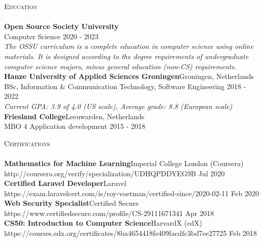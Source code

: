 \documentclass[a4paper]{article}
\newcommand{\lineunder} {
    \vspace*{-8pt} \\
    \hspace*{-18pt} \hrulefill \\
}
\newcommand{\header} [1] {
    {\hspace*{-18pt}\vspace*{6pt} \textsc{#1}}
    \vspace*{-6pt} \lineunder
}
\begin{document}
\header{Education}
\textbf{Open Source Society University}\\
Computer Science \hfill 2020 - 2023\\
\vspace{1mm}
\emph{The OSSU curriculum is a complete education in computer science using online materials. It is designed according to the degree requirements of undergraduate computer science majors, minus general education (non-CS) requirements.}\\
\vspace{2mm}
\textbf{Hanze University of Applied Sciences Groningen}\hfill Groningen, Netherlands\\
BSc, Information \& Communication Technology, Software Engineering \hfill 2018 - 2022\\
\vspace{1mm}
\emph{Current GPA: 3.9 of 4.0 (US scale), Average grade: 8.8 (European scale)}\\
\vspace{2mm}
\textbf{Friesland College}\hfill Leeuwarden, Netherlands\\
MBO 4 Application development \hfill 2015 - 2018\\
\vspace{2mm}

\newpage

\header{Certifications}
\textbf{Mathematics for Machine Learning}\hfill Imperial College London (Coursera)\\
http://coursera.org/verify/specialization/UDHQPDDYEG9B \hfill Jul 2020\\
\vspace{2mm}
\textbf{Certified Laravel Developer}\hfill Laravel\\
https://exam.laravelcert.com/is/roy-voetman/certified-since/2020-02-11 \hfill Feb 2020\\
\vspace{2mm}
\textbf{Web Security Specialist}\hfill Certified Secure\\
https://www.certifiedsecure.com/profile/CS-29111671341 \hfill Apr 2018\\
\vspace{2mm}
\textbf{CS50: Introduction to Computer Science}\hfill HarvardX (edX)\\
https://courses.edx.org/certificates/8ba4654418fe409facdfc3bd7ee27725 \hfill Feb 2018\\
\vspace{2mm}
\end{document}
